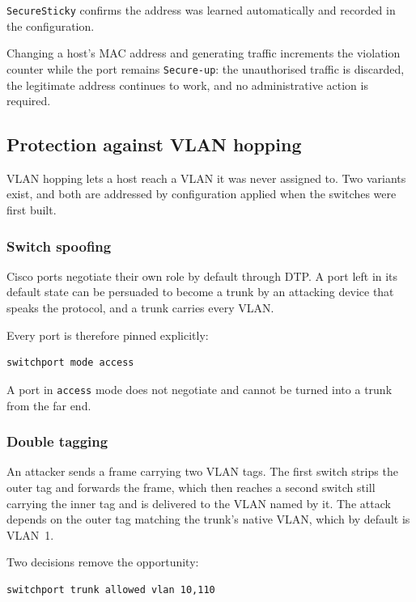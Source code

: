 \documentclass[12pt,a4paper]{article}
\begin{document}
\texttt{SecureSticky} confirms the address was learned automatically and
recorded in the configuration.

Changing a host's MAC address and generating traffic increments the violation
counter while the port remains \texttt{Secure-up}: the unauthorised traffic is
discarded, the legitimate address continues to work, and no administrative
action is required.

\subsection{Protection against VLAN hopping}

VLAN hopping lets a host reach a VLAN it was never assigned to. Two variants
exist, and both are addressed by configuration applied when the switches were
first built.

\subsubsection*{Switch spoofing}

Cisco ports negotiate their own role by default through DTP. A port left in its
default state can be persuaded to become a trunk by an attacking device that
speaks the protocol, and a trunk carries every VLAN.

Every port is therefore pinned explicitly:

\begin{lstlisting}
switchport mode access
\end{lstlisting}

A port in \texttt{access} mode does not negotiate and cannot be turned into a
trunk from the far end.

\subsubsection*{Double tagging}

An attacker sends a frame carrying two VLAN tags. The first switch strips the
outer tag and forwards the frame, which then reaches a second switch still
carrying the inner tag and is delivered to the VLAN named by it. The attack
depends on the outer tag matching the trunk's native VLAN, which by default is
VLAN~1.

Two decisions remove the opportunity:

\begin{lstlisting}
switchport trunk allowed vlan 10,110
\end{lstlisting}
\end{document}
